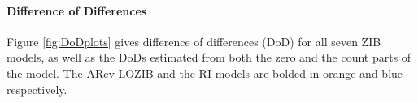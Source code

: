 \documentclass[12pt]{article}
\begin{document}

\paragraph{Difference of Differences}
Figure \ref{fig:DoDplots} gives difference of differences (DoD) for all seven ZIB models, as well as the DoDs estimated from both the zero and the count parts of the model. The ARcv LOZIB and the RI models are bolded in orange and blue respectively.
\end{document}
